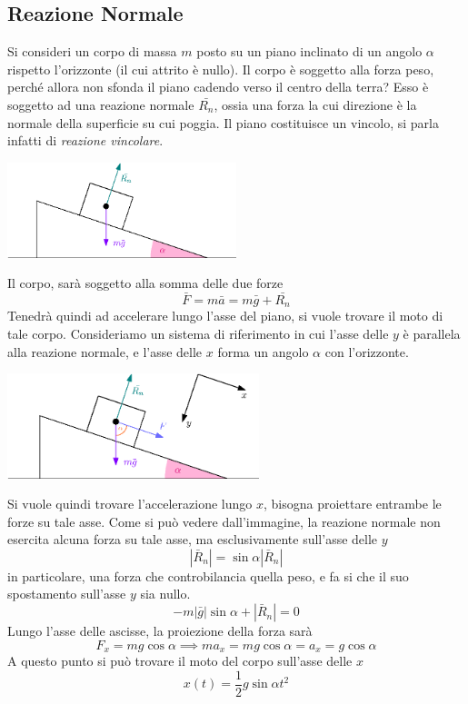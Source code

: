 \documentclass[10pt, letterpaper]{report}
\begin{document}
\subsection{Reazione Normale}
Si consideri un corpo di massa $m$ posto su un piano inclinato di un angolo $\alpha$ rispetto 
l'orizzonte (il cui attrito è nullo). Il corpo è soggetto alla forza peso, perché allora non sfonda il piano cadendo verso il 
centro della terra? Esso è soggetto ad una reazione normale $\bar{R_n}$, ossia una forza la cui direzione è la normale 
della superficie su cui poggia. Il piano costituisce un vincolo, si parla infatti di \textit{reazione vincolare}.
\begin{center}
    \includegraphics[width=0.5\textwidth]{images/reazionenormale.eps}
\end{center}
Il corpo, sarà soggetto alla somma delle due forze 
$$ \bar F = m\bar a = m\bar g + \bar{R_n}$$
Tenedrà quindi ad accelerare lungo l'asse del piano, si vuole trovare il moto di tale corpo. Consideriamo un 
sistema di riferimento in cui l'asse delle $y$ è parallela alla reazione normale, e l'asse delle $x$ 
forma un angolo $\alpha$ con l'orizzonte.
\begin{center}
    \includegraphics[width=0.55\textwidth]{images/reazionenormale2.eps}
\end{center}
Si vuole quindi trovare l'accelerazione lungo $x$, bisogna proiettare entrambe le forze su tale asse. 
Come si può vedere dall'immagine, la reazione normale non esercita alcuna forza su tale asse, ma esclusivamente sull'asse 
delle $y$ 
$$ |\bar R_n|=\sin\alpha|\bar R_n| $$
in particolare, una forza che controbilancia quella peso, e fa si che il suo spostamento sull'asse $y$ sia nullo. 
$$ -m|\bar g|\sin \alpha +|\bar R_n|=0$$
Lungo l'asse delle ascisse, la proiezione della forza sarà 
$$ F_x=mg\cos\alpha\implies ma_x=mg\cos\alpha=a_x=g\cos\alpha$$
A questo punto si può trovare il moto del corpo sull'asse delle $x$
$$ x(t)=\frac{1}{2}g\sin\alpha t^2$$
\end{document}

